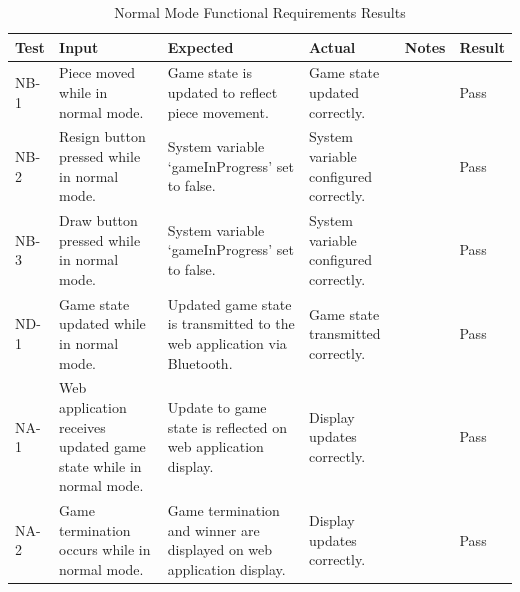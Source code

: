 \documentclass[12pt, titlepage]{article}
\begin{document}
\begin{table}[H]
    \centering
        \setlength{\leftmargini}{0cm}
        \begin{tabular}{| >{\centering\arraybackslash}m{1cm} | 
            >{\centering\arraybackslash}m{2.5cm} | 
            >{\centering\arraybackslash}m{4cm} | 
            >{\centering\arraybackslash}m{3cm} |
            >{\centering\arraybackslash}m{3cm} |
            >{\centering\arraybackslash}m{1.5cm} |}
        \hline
        \rowcolor[gray]{0.9}
        Test & Input & Expected & Actual & Notes & Result\\
        \hline
        NB-1 & Piece moved while in normal mode. & Game state is updated to reflect piece movement. & Game state updated correctly. &  & Pass \\
        \hline
        NB-2 & Resign button pressed while in normal mode. & System variable `gameInProgress' set to false. & System variable configured correctly. &  & Pass \\
        \hline
        NB-3 & Draw button pressed while in normal mode. & System variable `gameInProgress' set to false. & System variable configured correctly. &  & Pass \\
        \hline
        ND-1 & Game state updated while in normal mode. & Updated game state is transmitted to the web application via Bluetooth. & Game state transmitted correctly. &  & Pass \\
        \hline
        NA-1 & Web application receives updated game state while in normal mode. & Update to game state is reflected on web application display. & Display updates correctly. &  & Pass \\
        \hline
        NA-2 & Game termination occurs while in normal mode. & Game termination and winner are displayed on web application display. & Display updates correctly. &  & Pass \\
        \hline
        \end{tabular}
    \caption{Normal Mode Functional Requirements Results}
\end{table}

\pagebreak
\end{document}
